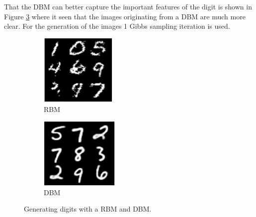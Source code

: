 \documentclass[a4paper,10pt]{article}
\begin{document}
That the DBM can better capture the important features of the digit is shown in Figure \ref{fig:compareDBM2} where it seen that the images originating from a DBM are much more clear. For the generation of the images 1 Gibbs sampling iteration is used. 

\begin{figure}[h]
	\begin{subfigure}{0.49\textwidth}
		\centering
		\includegraphics[width=0.4\linewidth]{DBM_RBM_gen.png}
		\caption{RBM}
		\label{fig:RBM_gen}
	\end{subfigure}	 	
	\begin{subfigure}{0.49\textwidth}
		\centering
		\includegraphics[width=0.4\linewidth]{DBM_gen.png}
		\caption{DBM}
		\label{fig:DBM_gen}
	\end{subfigure}	
	\caption{Generating digits with a RBM and DBM.}
	\label{fig:compareDBM2}
\end{figure}
\end{document}
